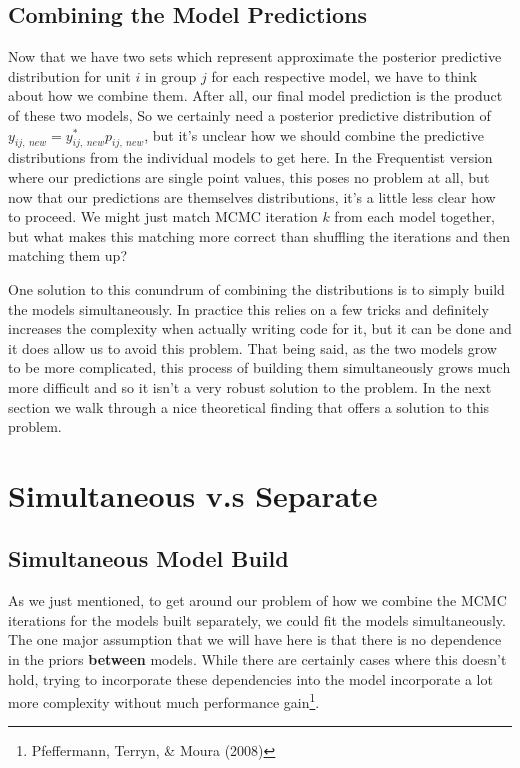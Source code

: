 \documentclass[12pt,twoside]{reedthesis}
\begin{document}
\hypertarget{combining-the-model-predictions}{%
\subsection{Combining the Model Predictions}\label{combining-the-model-predictions}}

Now that we have two sets which represent approximate the posterior predictive distribution for unit \(i\) in group \(j\) for each respective model, we have to think about how we combine them. After all, our final model prediction is the product of these two models, So we certainly need a posterior predictive distribution of \(y_{ij, \ new} = y_{ij, \ new}^*p_{ij, \ new}\), but it's unclear how we should combine the predictive distributions from the individual models to get here. In the Frequentist version where our predictions are single point values, this poses no problem at all, but now that our predictions are themselves distributions, it's a little less clear how to proceed. We might just match MCMC iteration \(k\) from each model together, but what makes this matching more correct than shuffling the iterations and then matching them up?

One solution to this conundrum of combining the distributions is to simply build the models simultaneously. In practice this relies on a few tricks and definitely increases the complexity when actually writing code for it, but it can be done and it does allow us to avoid this problem. That being said, as the two models grow to be more complicated, this process of building them simultaneously grows much more difficult and so it isn't a very robust solution to the problem. In the next section we walk through a nice theoretical finding that offers a solution to this problem.

\hypertarget{sepsim}{%
\section{Simultaneous v.s Separate}\label{sepsim}}

\hypertarget{simultaneous-model-build}{%
\subsection{Simultaneous Model Build}\label{simultaneous-model-build}}

As we just mentioned, to get around our problem of how we combine the MCMC iterations for the models built separately, we could fit the models simultaneously. The one major assumption that we will have here is that there is no dependence in the priors \textbf{between} models. While there are certainly cases where this doesn't hold, trying to incorporate these dependencies into the model incorporate a lot more complexity without much performance gain\footnote{Pfeffermann, Terryn, \& Moura (2008)}.
\end{document}
